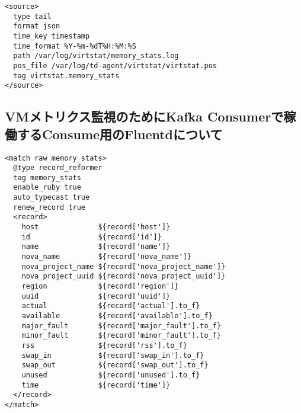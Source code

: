 \begin{lstlisting}
<source>
  type tail
  format json
  time_key timestamp
  time_format %Y-%m-%dT%H:%M:%S
  path /var/log/virtstat/memory_stats.log
  pos_file /var/log/td-agent/virtstat/virtstat.pos
  tag virtstat.memory_stats
</source>
\end{lstlisting}

\subsection{VMメトリクス監視のためにKafka Consumerで稼働するConsume用のFluentdについて}

\begin{lstlisting}
<match raw_memory_stats>
  @type record_reformer
  tag memory_stats
  enable_ruby true
  auto_typecast true
  renew_record true
  <record>
    host              ${record['host']}
    id                ${record['id']}
    name              ${record['name']}
    nova_name         ${record['nova_name']}
    nova_project_name ${record['nova_project_name']}
    nova_project_uuid ${record['nova_project_uuid']}
    region            ${record['region']}
    uuid              ${record['uuid']}
    actual            ${record['actual'].to_f}
    available         ${record['available'].to_f}
    major_fault       ${record['major_fault'].to_f}
    minor_fault       ${record['minor_fault'].to_f}
    rss               ${record['rss'].to_f}
    swap_in           ${record['swap_in'].to_f}
    swap_out          ${record['swap_out'].to_f}
    unused            ${record['unused'].to_f}
    time              ${record['time']}
  </record>
</match>
\end{lstlisting}
